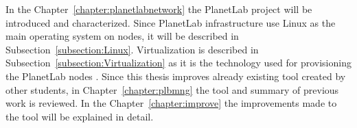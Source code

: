 In the Chapter~\ref{chapter:planetlabnetwork} the PlanetLab project will be introduced and characterized. Since PlanetLab infrastructure use Linux as the main operating system on nodes, it will be described in Subsection~\ref{subsection:Linux}. Virtualization is described in Subsection~\ref{subsection:Virtualization} as it is the technology used for provisioning the PlanetLab nodes \cite{planetlababout}. Since this thesis improves already existing tool created by other students, in Chapter~\ref{chapter:plbmng} the tool and summary of previous work is reviewed. In the Chapter~\ref{chapter:improve} the improvements made to the tool will be explained in detail.